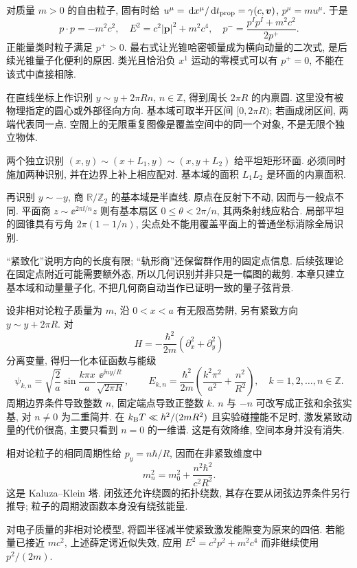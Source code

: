 对质量 $m>0$ 的自由粒子, 固有时给 $u^\mu=\,\mathrm d x^\mu/\,\mathrm d t_{\rm prop}=\gamma(c,\boldsymbol v)$, $p^\mu=mu^\mu$. 于是
\[
 p\cdot p=-m^2c^2,\quad E^2=c^2|\boldsymbol p|^2+m^2c^4,
 \quad p^- =\frac{p^Ip^I+m^2c^2}{2p^+}.
\]
正能量类时粒子满足 $p^+>0$. 最右式让光锥哈密顿量成为横向动量的二次式, 是后续光锥量子化便利的原因. 类光且恰沿负 $x^1$ 运动的零模式可以有 $p^+=0$, 不能在该式中直接相除.

在直线坐标上作识别 $y\sim y+2\pi R n$, $n\in\mathbb Z$, 得到周长 $2\pi R$ 的内禀圆. 这里没有被物理指定的圆心或外部径向方向. 基本域可取半开区间 $[0,2\pi R)$; 若画成闭区间, 两端代表同一点. 空間上的无限重复图像是覆盖空间中的同一个对象, 不是无限个独立物体.

两个独立识别 $(x,y)\sim(x+L_1,y)\sim(x,y+L_2)$ 给平坦矩形环面. 必须同时施加两种识别, 并在边界上补上相应配对. 基本域的面积 $L_1L_2$ 是环面的内禀面积.

\begin{center}
\end{center}

再识别 $y\sim-y$, 商 $\mathbb R/\mathbb Z_2$ 的基本域是半直线. 原点在反射下不动, 因而与一般点不同. 平面商 $z\sim\ee^{2\pi\ii/n}z$ 则有基本扇区 $0\leq\theta<2\pi/n$, 其两条射线应粘合. 局部平坦的圆锥具有亏角 $2\pi(1-1/n)$, 尖点处不能用覆盖平面上的普通坐标消除全局识别.

“紧致化”说明方向的长度有限; “轨形商”还保留群作用的固定点信息. 后续弦理论在固定点附近可能需要额外态, 所以几何识别并非只是一幅图的裁剪. 本章只建立基本域和动量量子化, 不把几何商自动当作已证明一致的量子弦背景.

设非相对论粒子质量为 $m$, 沿 $0<x<a$ 有无限高势阱, 另有紧致方向 $y\sim y+2\pi R$. 对
\[
 H=-\frac{\hbar^2}{2m}(\partial_x^2+\partial_y^2)
\]
分离变量, 得归一化本征函数与能级
\[
 \psi_{k,n}=\sqrt{\frac{2}{a}}\sin\frac{k\pi x}{a}
 \frac{\ee^{\ii ny/R}}{\sqrt{2\pi R}},\qquad
 E_{k,n}=\frac{\hbar^2}{2m}\left(\frac{k^2\pi^2}{a^2}+\frac{n^2}{R^2}\right),
 \quad k=1,2,\ldots, n\in\mathbb Z.
\]
周期边界条件导致整数 $n$, 固定端点导致正整数 $k$. $n$ 与 $-n$ 可改写成正弦和余弦实基, 对 $n\ne0$ 为二重简并. 在 $k_{\rm B}T\ll\hbar^2/(2mR^2)$ 且实验碰撞能不足时, 激发紧致动量的代价很高, 主要只看到 $n=0$ 的一维谱. 这是有效降维, 空间本身并没有消失.

相对论粒子的相同周期性给 $p_y=n\hbar/R$, 因而在非紧致维度中
\[
 m_n^2=m_0^2+\frac{n^2\hbar^2}{c^2R^2}.
\]
这是 Kaluza--Klein 塔. 闭弦还允许绕圆的拓扑绕数, 其存在要从闭弦边界条件另行推导; 粒子的周期波函数本身没有绕弦能量.

\begin{example}
对电子质量的非相对论模型, 将圆半径减半使紧致激发能隙变为原来的四倍. 若能量已接近 $mc^2$, 上述薛定谔近似失效, 应用 $E^2=c^2p^2+m^2c^4$ 而非继续使用 $p^2/(2m)$.
\end{example}
